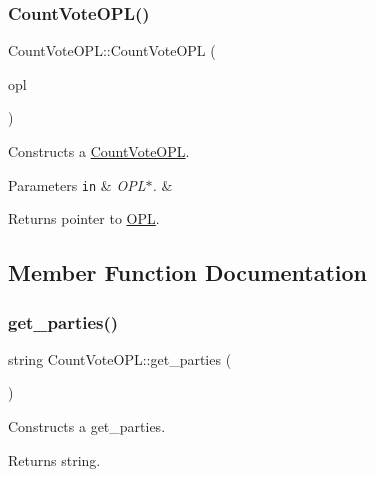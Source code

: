 \subsubsection{\texorpdfstring{Count\+Vote\+O\+P\+L()}{CountVoteOPL()}}
{\footnotesize\ttfamily Count\+Vote\+O\+P\+L\+::\+Count\+Vote\+O\+PL (\begin{DoxyParamCaption}\item[{\hyperlink{classOPL}{O\+PL} $\ast$}]{opl }\end{DoxyParamCaption})}



Constructs a \hyperlink{classCountVoteOPL}{Count\+Vote\+O\+PL}. 


\begin{DoxyParams}[1]{Parameters}
\mbox{\tt in}  & {\em O\+P\+L$\ast$.} & \\
\hline
\end{DoxyParams}
\begin{DoxyReturn}{Returns}
pointer to \hyperlink{classOPL}{O\+PL}. 
\end{DoxyReturn}


\subsection{Member Function Documentation}
\mbox{\label{classCountVoteOPL_a8ac17200490e9b34085be35acffa4d63}} 
\subsubsection{\texorpdfstring{get\+\_\+parties()}{get\_parties()}}
{\footnotesize\ttfamily string Count\+Vote\+O\+P\+L\+::get\+\_\+parties (\begin{DoxyParamCaption}{ }\end{DoxyParamCaption})}



Constructs a get\+\_\+parties. 

\begin{DoxyReturn}{Returns}
string. 
\end{DoxyReturn}
\mbox{\label{classCountVoteOPL_a1c8cfe1e91d5b937d4ae155445528e99}} 
